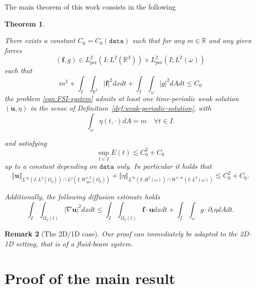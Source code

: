 \documentclass[10pt,a4paper]{article}
\newtheorem{theorem}{Theorem}[section]
\newtheorem{remark}[theorem]{Remark}
\numberwithin{equation}{section}
\begin{document}
The main theorem of this work consists in the following
\begin{theorem}\label{thm:main} 

There exists a constant $C_{0}=C_{0}(\texttt{data})$    such that  for any $m \in \mathbb{R}$ and any given forces
\[
\left(\mathbf{f},g\right)\in L_{\text{per}}^{2}\left(I;L^{2}\left(\mathbb{R}^{3}\right)\right)\times L_{\text{per}}^{2}\left(I;L^{2}\left(\omega\right)\right)
\]
such that 
\[ m^2+
\int_{I}\int_{\mathbb{R}^{3}}\left|\mathbf{f}\right|^{2}dxdt+\int_{I}\int_{\omega}\left|g\right|^{2}dAdt\le C_0
\]
 the problem \eqref{eqn:FSI-system}  admits at least one  time-periodic weak solution $(\mathbf{u},\eta)$ in the sense of Definition~\ref{def:weak-periodic-solution}, with
\begin{equation}
\int_{\omega}\eta(t,\cdot)dA=m \quad \forall t\in I.
\end{equation} 

and satisfying 
\begin{equation}
    \sup_{t\in I}E\left(t\right)\lesssim C_{0}^{2}+C_{0}
\end{equation}
up to a constant depending on $\texttt{data}$ only. 
In particular it holds that \begin{equation}
\left\Vert \mathbf{u}\right\Vert _{L^{\infty}\left(I;L^{2}\left(\Omega_{\eta}\right)\right)\cap L^{2}\left(I;W_{\text{div}}^{1,2}\left(\Omega_{\eta}\right)\right)}+\left\Vert \eta\right\Vert _{L^{\infty}\left(I;H_{}^{2}\left(\omega\right)\right)\cap W^{1,\infty}\left(I;L^{2}\left(\omega\right)\right)}\lesssim C_{0}^{2}+C_{0}.
\end{equation} 


Additionally,  the following  \emph{diffusion estimate} holds
\begin{equation}\label{eqn:energy-estimate-2-chap02}
\int_{I}\int_{\Omega_\eta\left(t\right)}\left|\nabla \mathbf{u}\right|^{2}dxdt\le\int_{I}\int_{\Omega_\eta\left(t\right)}\mathbf{f}\cdot \mathbf{u}dxdt+\int_{I}\int_{\omega}g\cdot\partial_{t}\eta dAdt.
\end{equation}
\end{theorem}

\begin{remark}[The 2D/1D case]
Our proof can immediately be adapted to the 2D-1D setting, that is of a  fluid-beam  system. 
\end{remark}

\section{Proof of the main result}\label{sec:proof}
\end{document}
